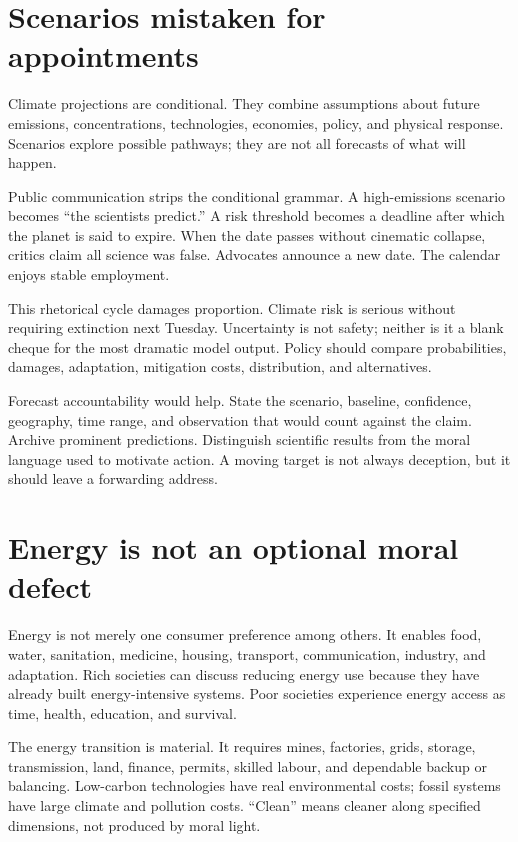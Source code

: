 \documentclass[12pt,a4paper]{book}
\begin{document}
\section{Scenarios mistaken for appointments}

Climate projections are conditional.  They combine assumptions about future
emissions, concentrations, technologies, economies, policy, and physical
response.  Scenarios explore possible pathways; they are not all forecasts of
what will happen.

Public communication strips the conditional grammar.  A high-emissions
scenario becomes ``the scientists predict.''  A risk threshold becomes a
deadline after which the planet is said to expire.  When the date passes
without cinematic collapse, critics claim all science was false.  Advocates
announce a new date.  The calendar enjoys stable employment.

This rhetorical cycle damages proportion.  Climate risk is serious without
requiring extinction next Tuesday.  Uncertainty is not safety; neither is it a
blank cheque for the most dramatic model output.  Policy should compare
probabilities, damages, adaptation, mitigation costs, distribution, and
alternatives.

Forecast accountability would help.  State the scenario, baseline, confidence,
geography, time range, and observation that would count against the claim.
Archive prominent predictions.  Distinguish scientific results from the moral
language used to motivate action.  A moving target is not always deception,
but it should leave a forwarding address.

\section{Energy is not an optional moral defect}

Energy is not merely one consumer preference among others.  It enables food,
water, sanitation, medicine, housing, transport, communication, industry, and
adaptation.  Rich societies can discuss reducing energy use because they have
already built energy-intensive systems.  Poor societies experience energy
access as time, health, education, and survival.

The energy transition is material.  It requires mines, factories, grids,
storage, transmission, land, finance, permits, skilled labour, and dependable
backup or balancing.  Low-carbon technologies have real environmental costs;
fossil systems have large climate and pollution costs.  ``Clean'' means cleaner
along specified dimensions, not produced by moral light.
\end{document}
